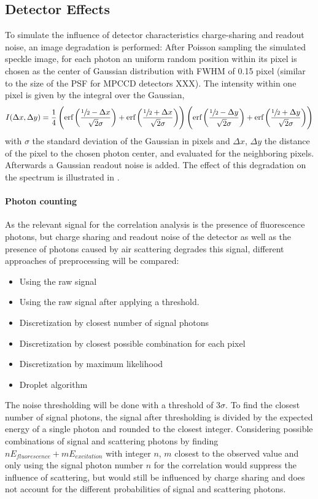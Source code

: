 \subsection{Detector Effects}
\label{sect:chargesharing}
To simulate the influence of detector characteristics charge-sharing and readout noise, an image degradation is performed: After Poisson sampling the simulated speckle image, for each photon an uniform random position within its pixel is chosen as the center of Gaussian distribution with FWHM of 0.15 pixel  (similar to the size of the PSF for MPCCD detectors XXX).
The intensity within one pixel is given by the integral over the Gaussian,
\begin{equation}
	I(\Delta x,\Delta y)=\frac{1}{4} \left(\text{erf}\left(\frac{\sfrac{1}{2}-\Delta x}{\sqrt{2}
		\sigma}\right)+\text{erf}\left(\frac{\sfrac{1}{2}+\Delta x}{\sqrt{2} \sigma}\right)\right) \left(\text{erf}\left(\frac{\sfrac{1}{2}-\Delta y}{\sqrt{2}
		\sigma}\right)+\text{erf}\left(\frac{\sfrac{1}{2}+\Delta y}{\sqrt{2} \sigma}\right)\right)
\end{equation}
with $\sigma$ the standard deviation of the Gaussian in pixels and $\Delta x$, $\Delta y$ the distance of the pixel to the chosen photon center, and evaluated for the neighboring pixels. Afterwards a Gaussian readout noise is added. The effect of this degradation on the spectrum is illustrated in .



\paragraph{Photon counting}
As the relevant signal for the correlation analysis is the presence of fluorescence photons, but charge sharing and readout noise of the detector as well as the presence of photons caused by air scattering degrades this signal, different approaches  of preprocessing will be compared:

\begin{itemize}
	\item Using the raw signal
	\item Using the raw signal after applying a threshold.
	\item Discretization by closest number of signal photons
	\item Discretization by closest possible combination for each pixel
	\item Discretization by maximum likelihood
	\item Droplet algorithm
\end{itemize}
The noise thresholding will be done with a threshold of 3$\sigma$. To find the closest number of signal photons, the signal after thresholding is divided by the expected energy of a single photon and rounded to the closest integer. Considering possible combinations of signal and scattering photons by finding  $nE_{fluorescence}+mE_{excitation}$ with integer $n$, $m$ closest to the observed value and only using the signal photon number $n$ for the correlation would suppress the influence of scattering, but would still be influenced by charge sharing and does not account for the different probabilities of signal and scattering photons.

